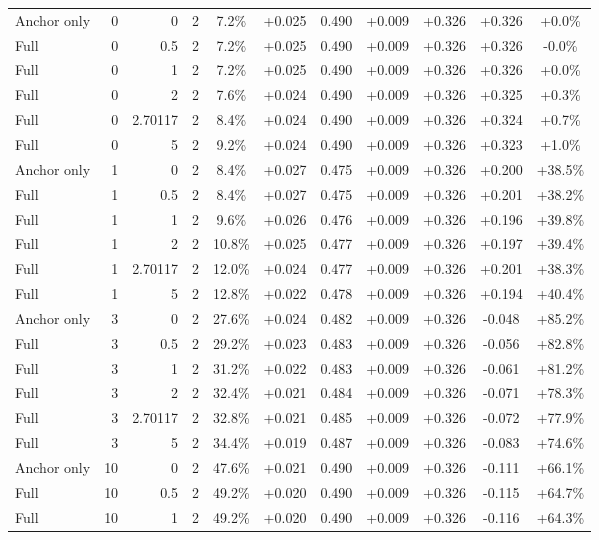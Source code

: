 \begin{table}[htbp]
\begin{tabular}{lrrrccccccc}
Anchor only & 0 & 0 & 2 & 7.2\% & +0.025 & 0.490 & +0.009 & +0.326 & +0.326 & +0.0\% \\
Full & 0 & 0.5 & 2 & 7.2\% & +0.025 & 0.490 & +0.009 & +0.326 & +0.326 & -0.0\% \\
Full & 0 & 1 & 2 & 7.2\% & +0.025 & 0.490 & +0.009 & +0.326 & +0.326 & +0.0\% \\
Full & 0 & 2 & 2 & 7.6\% & +0.024 & 0.490 & +0.009 & +0.326 & +0.325 & +0.3\% \\
Full & 0 & 2.70117 & 2 & 8.4\% & +0.024 & 0.490 & +0.009 & +0.326 & +0.324 & +0.7\% \\
Full & 0 & 5 & 2 & 9.2\% & +0.024 & 0.490 & +0.009 & +0.326 & +0.323 & +1.0\% \\
Anchor only & 1 & 0 & 2 & 8.4\% & +0.027 & 0.475 & +0.009 & +0.326 & +0.200 & +38.5\% \\
Full & 1 & 0.5 & 2 & 8.4\% & +0.027 & 0.475 & +0.009 & +0.326 & +0.201 & +38.2\% \\
Full & 1 & 1 & 2 & 9.6\% & +0.026 & 0.476 & +0.009 & +0.326 & +0.196 & +39.8\% \\
Full & 1 & 2 & 2 & 10.8\% & +0.025 & 0.477 & +0.009 & +0.326 & +0.197 & +39.4\% \\
Full & 1 & 2.70117 & 2 & 12.0\% & +0.024 & 0.477 & +0.009 & +0.326 & +0.201 & +38.3\% \\
Full & 1 & 5 & 2 & 12.8\% & +0.022 & 0.478 & +0.009 & +0.326 & +0.194 & +40.4\% \\
Anchor only & 3 & 0 & 2 & 27.6\% & +0.024 & 0.482 & +0.009 & +0.326 & -0.048 & +85.2\% \\
Full & 3 & 0.5 & 2 & 29.2\% & +0.023 & 0.483 & +0.009 & +0.326 & -0.056 & +82.8\% \\
Full & 3 & 1 & 2 & 31.2\% & +0.022 & 0.483 & +0.009 & +0.326 & -0.061 & +81.2\% \\
Full & 3 & 2 & 2 & 32.4\% & +0.021 & 0.484 & +0.009 & +0.326 & -0.071 & +78.3\% \\
Full & 3 & 2.70117 & 2 & 32.8\% & +0.021 & 0.485 & +0.009 & +0.326 & -0.072 & +77.9\% \\
Full & 3 & 5 & 2 & 34.4\% & +0.019 & 0.487 & +0.009 & +0.326 & -0.083 & +74.6\% \\
Anchor only & 10 & 0 & 2 & 47.6\% & +0.021 & 0.490 & +0.009 & +0.326 & -0.111 & +66.1\% \\
Full & 10 & 0.5 & 2 & 49.2\% & +0.020 & 0.490 & +0.009 & +0.326 & -0.115 & +64.7\% \\
Full & 10 & 1 & 2 & 49.2\% & +0.020 & 0.490 & +0.009 & +0.326 & -0.116 & +64.3\% \\

\end{tabular}
\end{table}
